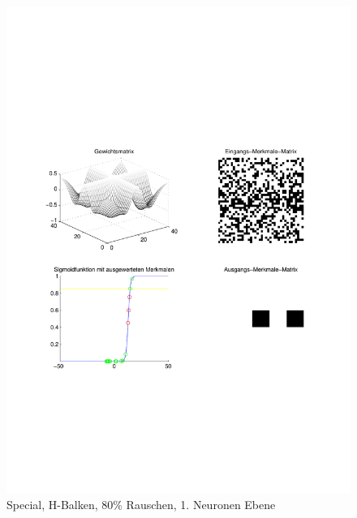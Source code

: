 \begin{figure}[hbt]
	\begin{minipage}{0.8 \textwidth}
		\includegraphics[width=\textwidth]{./Bilder/Auswertung/Endergebnis/TypeSpecial_Rauschen80_H_Line_Layer1}
		\caption{Special, H-Balken, 80\% Rauschen, 1. Neuronen Ebene}
		\label{Special_H_80_1}
	\end{minipage}
	\vfill
	\begin{minipage}{0.8 \textwidth}

\end{minipage}
\end{figure}
